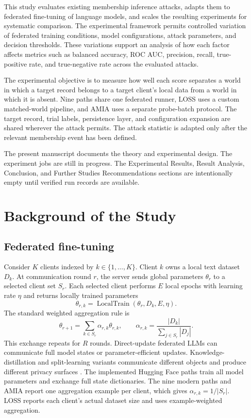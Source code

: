 \documentclass[11pt]{article}
\begin{document}
This study evaluates existing membership inference attacks, adapts them to federated fine-tuning of language models, and scales the resulting experiments for systematic comparison. The experimental framework permits controlled variation of federated training conditions, model configurations, attack parameters, and decision thresholds. These variations support an analysis of how each factor affects metrics such as balanced accuracy, ROC AUC, precision, recall, true-positive rate, and true-negative rate across the evaluated attacks.

The experimental objective is to measure how well each score separates a world in which a target record belongs to a target client's local data from a world in which it is absent. Nine paths share one federated runner, LOSS uses a custom matched-world pipeline, and AMIA uses a separate probe-batch protocol. The target record, trial labels, persistence layer, and configuration expansion are shared wherever the attack permits. The attack statistic is adapted only after the relevant membership event has been defined.

The present manuscript documents the theory and experimental design. The experiment jobs are still in progress. The Experimental Results, Result Analysis, Conclusion, and Further Studies Recommendations sections are intentionally empty until verified run records are available.

\section{Background of the Study}

\subsection{Federated fine-tuning}

Consider $K$ clients indexed by $k\in\{1,\ldots,K\}$. Client $k$ owns a local text dataset $D_k$. At communication round $r$, the server sends global parameters $\theta_r$ to a selected client set $S_r$. Each selected client performs $E$ local epochs with learning rate $\eta$ and returns locally trained parameters
\begin{equation}
    \theta_{r,k}=\operatorname{LocalTrain}(\theta_r,D_k,E,\eta).
\end{equation}
The standard weighted aggregation rule is
\begin{equation}
    \theta_{r+1}=\sum_{k\in S_r}\alpha_{r,k}\theta_{r,k},
    \qquad
    \alpha_{r,k}=\frac{|D_k|}{\sum_{j\in S_r}|D_j|}.
    \label{eq:fedavg}
\end{equation}
This exchange repeats for $R$ rounds. Direct-update federated LLMs can communicate full model states or parameter-efficient updates. Knowledge-distillation and split-learning variants communicate different objects and produce different privacy surfaces \citep{yan2025federated,cheng2025toward}. The implemented Hugging Face paths train all model parameters and exchange full state dictionaries. The nine modern paths and AMIA report one aggregation example per client, which gives $\alpha_{r,k}=1/|S_r|$. LOSS reports each client's actual dataset size and uses example-weighted aggregation.
\end{document}
